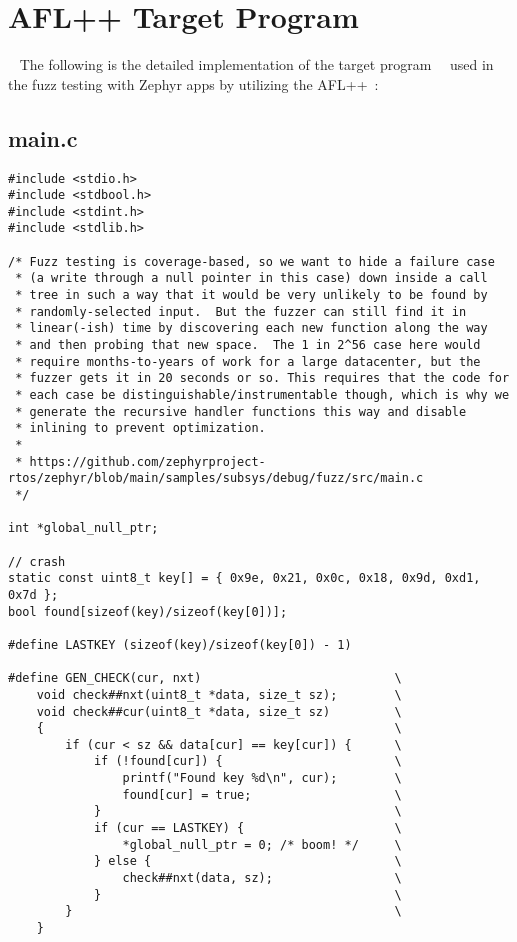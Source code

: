 
\chapter{AFL++ Target Program}~\label{appx:first}
The following is the detailed implementation of the
target program~\cite{FuzzingE54:online}~\cite{zephyrsa35:online} used in
the fuzz testing with Zephyr apps by utilizing the AFL++~\cite{257204}:

\section*{main.c}
\begin{verbatim}
#include <stdio.h>
#include <stdbool.h>
#include <stdint.h>
#include <stdlib.h>

/* Fuzz testing is coverage-based, so we want to hide a failure case
 * (a write through a null pointer in this case) down inside a call
 * tree in such a way that it would be very unlikely to be found by
 * randomly-selected input.  But the fuzzer can still find it in
 * linear(-ish) time by discovering each new function along the way
 * and then probing that new space.  The 1 in 2^56 case here would
 * require months-to-years of work for a large datacenter, but the
 * fuzzer gets it in 20 seconds or so. This requires that the code for
 * each case be distinguishable/instrumentable though, which is why we
 * generate the recursive handler functions this way and disable
 * inlining to prevent optimization.
 *
 * https://github.com/zephyrproject-rtos/zephyr/blob/main/samples/subsys/debug/fuzz/src/main.c
 */

int *global_null_ptr;

// crash
static const uint8_t key[] = { 0x9e, 0x21, 0x0c, 0x18, 0x9d, 0xd1, 0x7d };
bool found[sizeof(key)/sizeof(key[0])];

#define LASTKEY (sizeof(key)/sizeof(key[0]) - 1)

#define GEN_CHECK(cur, nxt)                           \
    void check##nxt(uint8_t *data, size_t sz);        \
    void check##cur(uint8_t *data, size_t sz)         \
    {                                                 \
        if (cur < sz && data[cur] == key[cur]) {      \
            if (!found[cur]) {                        \
                printf("Found key %d\n", cur);        \
                found[cur] = true;                    \
            }                                         \
            if (cur == LASTKEY) {                     \
                *global_null_ptr = 0; /* boom! */     \
            } else {                                  \
                check##nxt(data, sz);                 \
            }                                         \
        }                                             \
    }


\end{verbatim}
